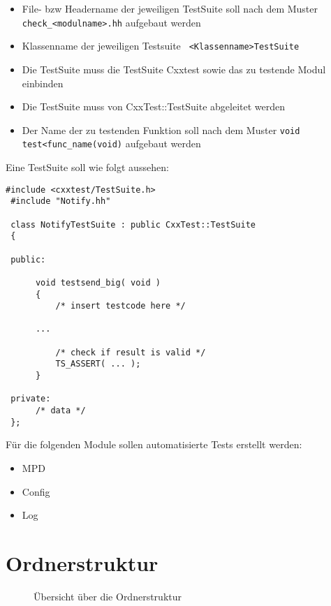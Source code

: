 \begin{itemize}
	\item File- bzw Headername der jeweiligen TestSuite soll nach dem Muster \verb+check_<modulname>.hh+ aufgebaut werden
	\item Klassenname der jeweiligen Testsuite \verb+ <Klassenname>TestSuite+
	\item Die TestSuite muss die TestSuite Cxxtest sowie das zu testende Modul einbinden
	\item Die TestSuite muss von CxxTest::TestSuite abgeleitet werden 
	\item Der Name der zu testenden Funktion soll nach dem Muster \verb+void test<func_name(void)+ aufgebaut werden
\end{itemize}  


Eine TestSuite soll wie folgt aussehen:


\begin{lstlisting}[caption={TestSuite Template check\_notify.hh Beispielcodefragment für die Klasse ,,Notify''},label={lst:cxxtemp}]
 #include <cxxtest/TestSuite.h>
 #include "Notify.hh"
 
 class NotifyTestSuite : public CxxTest::TestSuite
 {
  
 public:
  
      void testsend_big( void )
      {
          /* insert testcode here */
 	  
 	  ...
 	   
          /* check if result is valid */    
          TS_ASSERT( ... );
      }
   
 private:
      /* data */
 };
\end{lstlisting}

Für die folgenden Module sollen automatisierte Tests erstellt werden:
\begin{itemize}
    \item MPD
    \item Config
    \item Log
\end{itemize}

\section{Ordnerstruktur}
\begin{figure}[htb!]
    
    \caption{Übersicht über die Ordnerstruktur}
    \label{src_tree}
\end{figure}

